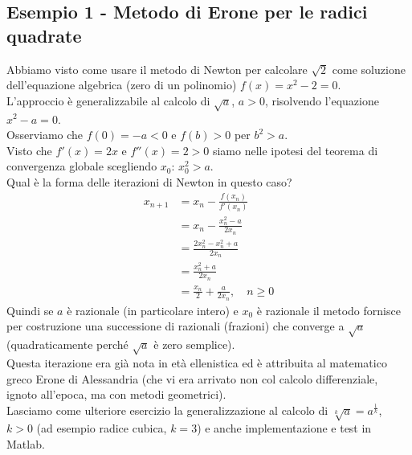 \subsection{Esempio 1 - Metodo di Erone per le radici quadrate}
Abbiamo visto come usare il metodo di Newton per calcolare $\sqrt{2}$ come soluzione dell'equazione algebrica (zero di un polinomio) $f(x) = x^2 - 2 = 0$.\\
L'approccio è generalizzabile al calcolo di $\sqrt{a}$, $a>0$, risolvendo l'equazione $x^2 - a = 0$.\\
Osserviamo che $f(0) = - a < 0$ e $f(b) > 0$ per $b^2 > a$.\\
Visto che $f'(x) = 2x$ e $f''(x) = 2 > 0$ siamo nelle ipotesi del teorema di convergenza globale scegliendo $x_0$: $x^2_0 > a$.\\
Qual è la forma delle iterazioni di Newton in questo caso?
\[\begin{split}
    x_{n+1} & = x_n - \frac{f(x_n)}{f'(x_n)} \\
    & = x_n - \frac{x_n^2-a}{2 x_n} \\
    & = \frac{2 x_n^2 - x_n^2 + a}{2 x_n} \\
    & = \frac{x_n^2 + a}{2 x_n} \\
    & = \frac{x_n}{2} + \frac{a}{2 x_n}, \quad n \ge 0
\end{split}\]
Quindi se $a$ è razionale (in particolare intero) e $x_0$ è razionale il metodo fornisce per costruzione una successione di razionali (frazioni) che converge a $\sqrt{a}$ (quadraticamente perché $\sqrt{a}$ è zero semplice).\\
Questa iterazione era già nota in età ellenistica ed è attribuita al matematico greco Erone di Alessandria (che vi era arrivato non col calcolo differenziale, ignoto all'epoca, ma con metodi geometrici).\\
Lasciamo come ulteriore esercizio la generalizzazione al calcolo di $\sqrt[k]{a} = a^{\frac{1}{k}}$, $k>0$ (ad esempio radice cubica, $k=3$) e anche implementazione e test in Matlab.

